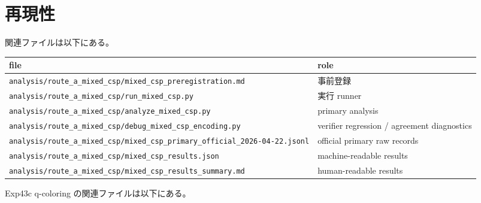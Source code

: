 \documentclass[12pt,a4paper]{article}
\begin{document}
\section{再現性}\label{ux518dux73feux6027}

関連ファイルは以下にある。

{\def\LTcaptype{table} %
\begin{longtable}[]{@{}
  >{\raggedright\arraybackslash}p{}
  >{\raggedright\arraybackslash}p{}@{}}
\toprule\noalign{}
\begin{minipage}[b]{\linewidth}\raggedright
file
\end{minipage} & \begin{minipage}[b]{\linewidth}\raggedright
role
\end{minipage} \\
\midrule\noalign{}
\endhead
\bottomrule\noalign{}
\endlastfoot
\texttt{analysis/route\_a\_mixed\_csp/mixed\_csp\_preregistration.md} & 事前登録 \\
\texttt{analysis/route\_a\_mixed\_csp/run\_mixed\_csp.py} & 実行 runner \\
\texttt{analysis/route\_a\_mixed\_csp/analyze\_mixed\_csp.py} & primary analysis \\
\texttt{analysis/route\_a\_mixed\_csp/debug\_mixed\_csp\_encoding.py} & verifier regression / agreement diagnostics \\
\texttt{analysis/route\_a\_mixed\_csp/mixed\_csp\_primary\_official\_2026-04-22.jsonl} & official primary raw records \\
\texttt{analysis/route\_a\_mixed\_csp/mixed\_csp\_results.json} & machine-readable results \\
\texttt{analysis/route\_a\_mixed\_csp/mixed\_csp\_results\_summary.md} & human-readable results \\
\end{longtable}
}

Exp43c q-coloring の関連ファイルは以下にある。
\end{document}
